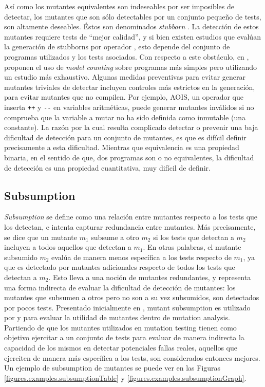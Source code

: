 As\'i como los mutantes equivalentes son indeseables por ser imposibles de detectar, los mutantes que son s\'olo detectables por un conjunto peque\~no de tests, son altamente deseables. \'Estos son denominados \emph{stubborn} \cite{bibliography.mutation.evaluation.stubbornHieronsHD99}. La detecci\'on de estos mutantes requiere tests de ``mejor calidad'', y si bien existen estudios que eval\'uan la generaci\'on de stubborns por operador \cite{bibliography.mutation.evaluation.stubborn}, esto depende del conjunto de programas utilizados y los tests asociados. Con respecto a este obst\'aculo, en \cite{bibliography.mutation.evaluation.hardnessVisser}, proponen el uso de \emph{model counting} sobre programas m\'as simples pero utilizando un estudio m\'as exhaustivo. Algunas medidas preventivas para evitar generar mutantes triviales de detectar incluyen controles m\'as estrictos en la generaci\'on, para evitar mutantes que no compilen. Por ejemplo, AOIS, un operador que inserta \lstinline|++| y \lstinline|--| en variables aritm\'eticas, puede generar mutantes inv\'alidos si no comprueba que la variable a mutar no ha sido definida como inmutable (una constante). La raz\'on por la cual resulta complicado detectar o prevenir una baja dificultad de detecci\'on para un conjunto de mutantes, es que es dif\'icil definir precisamente a esta dificultad. Mientras que equivalencia es una propiedad binaria, en el sentido de que, dos programas son o no equivalentes, la dificultad de detecci\'on es una propiedad cuantitativa, muy dif\'icil de definir. 


\subsection{Subsumption}

\emph{Subsumption} se define como una relaci\'on entre mutantes respecto a los tests que los detectan, e intenta capturar redundancia entre mutantes. M\'as precisamente, se dice que un mutante $m_1$ subsume a otro $m_2$ si los tests que detectan a $m_2$ incluyen a todos aquellos que detectan a $m_1$. En otras palabras, el mutante subsumido $m_2$ eval\'ua de manera menos espec\'ifica a los tests respecto de $m_1$, ya que es detectado por mutantes adicionales respecto de todos los tests que detectan a $m_2$. Esto lleva a una noci\'on de mutantes redundantes, y representa una forma indirecta de evaluar la dificultad de detecci\'on de mutantes: los mutantes que subsumen a otros pero no son a su vez subsumidos, son detectados por pocos tests. Presentado inicialmente en \cite{bibliography.mutation.selection.Offutt96}, mutant subsumption es utilizado por \cite{bibliography.mutation.minimizing.dynamicsubsumption} y \cite{bibliography.mutation.evaluation.JustKA17} para evaluar la utilidad de mutantes dentro de mutation analysis. Partiendo de que los mutantes utilizados en mutation testing tienen como objetivo ejercitar a un conjunto de tests para evaluar de manera indirecta la capacidad de los mismos en detectar potenciales fallas reales, aquellos que ejerciten de manera m\'as espec\'ifica a los tests, son considerados entonces mejores. Un ejemplo de subsumption de mutantes se puede ver en las Figuras \ref{figures.examples.subsumptionTable} y \ref{figures.examples.subsumptionGraph}.

